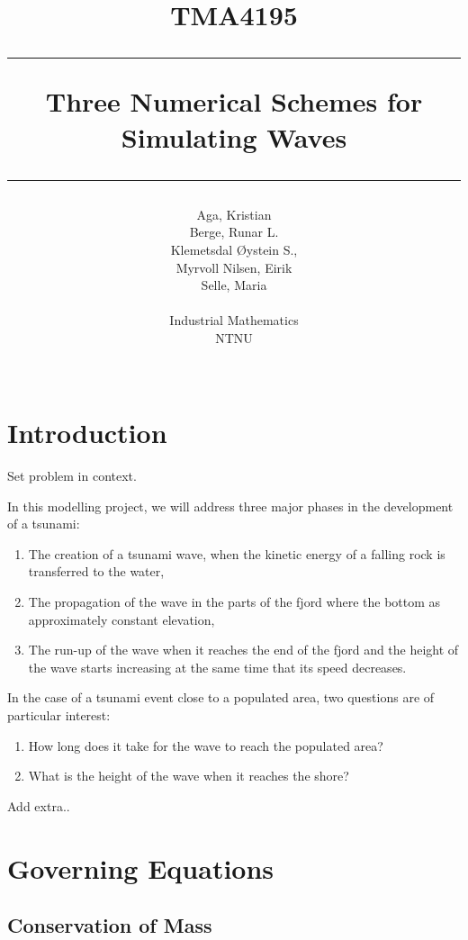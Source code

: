 \documentclass[12pt]{article}
\author{Aga, Kristian \\ Berge, Runar L. \\ Klemetsdal Øystein S.,\\
	Myrvoll Nilsen, Eirik \\ Selle, Maria\\\\
	Industrial Mathematics\\
	NTNU \\\\
}
\title{
TMA4195 \\ \vspace{5pt}
\hrule \vspace{10pt}
       {\Huge \textbf{Three Numerical Schemes for Simulating Waves}}
\vspace{10pt}\hrule
}
\begin{document}
\maketitle
\clearpage
%
%
\section{Introduction}

Set problem in context.

In this modelling project, we will address three major phases in the development of a tsunami:
\begin{enumerate}[label = \emph{(\roman*)}]
    \item    The creation of a tsunami wave, when the kinetic energy of a falling rock is transferred to the
             water,
    \item    The propagation of the wave in the parts of the fjord where the bottom as approximately constant
             elevation,
    \item    The run-up of the wave when it reaches the end of the fjord and the height of the wave starts
             increasing at the same time that its speed decreases.
\end{enumerate}

In the case of a tsunami event close to a populated area, two questions are of particular interest:
\begin{enumerate}[label = \emph{(\roman*)}]
    \item    How long does it take for the wave to reach the populated area?
    \item    What is the height of the wave when it reaches the shore?
\end{enumerate}

Add extra..

\section{Governing Equations}

\subsection{Conservation of Mass}
\end{document}
